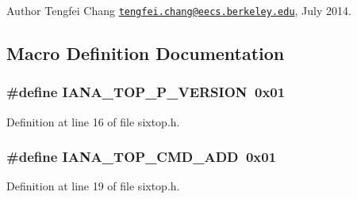 \begin{DoxyAuthor}{Author}
Tengfei Chang \href{mailto:tengfei.chang@eecs.berkeley.edu}{\tt tengfei.\+chang@eecs.\+berkeley.\+edu}, July 2014. 
\end{DoxyAuthor}


\subsection{Macro Definition Documentation}
\subsubsection[{\texorpdfstring{I\+A\+N\+A\+\_\+6\+T\+O\+P\+\_\+6\+P\+\_\+\+V\+E\+R\+S\+I\+ON}{IANA_6TOP_6P_VERSION}}]{\setlength{\rightskip}{0pt plus 5cm}\#define I\+A\+N\+A\+\_\+T\+O\+P\+\_\+P\+\_\+\+V\+E\+R\+S\+I\+ON~0x01}\hypertarget{group__sixtop_ga74014f9a4d1b5540a3e44369e296b449}{}\label{group__sixtop_ga74014f9a4d1b5540a3e44369e296b449}


Definition at line 16 of file sixtop.\+h.

\subsubsection[{\texorpdfstring{I\+A\+N\+A\+\_\+6\+T\+O\+P\+\_\+\+C\+M\+D\+\_\+\+A\+DD}{IANA_6TOP_CMD_ADD}}]{\setlength{\rightskip}{0pt plus 5cm}\#define I\+A\+N\+A\+\_\+T\+O\+P\+\_\+\+C\+M\+D\+\_\+\+A\+DD~0x01}\hypertarget{group__sixtop_gaed6611a612519c8be4dcc1b8931ae952}{}\label{group__sixtop_gaed6611a612519c8be4dcc1b8931ae952}


Definition at line 19 of file sixtop.\+h.

